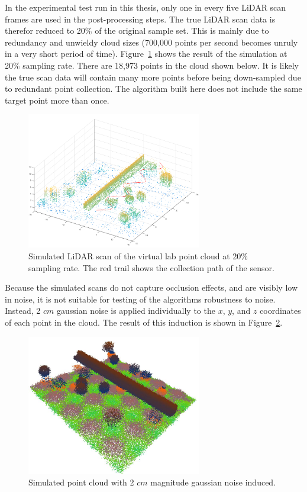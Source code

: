 \documentclass[12pt]{drexelthesis}
\begin{document}
In the experimental test run in this thesis, only one in every five LiDAR scan frames are used in the post-processing steps. The true LiDAR scan data is therefor reduced to 20\% of the original sample set. This is mainly due to redundancy and unwieldy cloud sizes (700,000 points per second becomes unruly in a very short period of time). Figure~\ref{lidarsim:20psample} shows the result of the simulation at 20\% sampling rate. There are 18,973 points in the cloud shown below. It is likely the true scan data will contain many more points before being down-sampled due to redundant point collection. The algorithm built here does not include the same target point more than once.

\begin{figure}[!ht]
	\centering
	\includegraphics[width=3in]{simulated-lab-scan/lidarSim/20psample.png}
	\caption[Simulated LiDAR scan at 20\% sampling rate]{\centering Simulated LiDAR scan of the virtual lab point cloud at 20\% sampling rate. The red trail shows the collection path of the sensor.}
	\label{lidarsim:20psample}
\end{figure}

Because the simulated scans do not capture occlusion effects, and are visibly low in noise, it is not suitable for testing of the algorithms robustness to noise. Instead, 2 $cm$ gaussian noise is applied individually to the $x$, $y$, and $z$ coordinates of each point in the cloud. The result of this induction is shown in Figure~\ref{2cmnoise:raw}.

\begin{figure}[!ht] 
	\centering
		\includegraphics[width=3in]{simulated-lab-scan/2cmnoise/rawcloud.jpg}
		\caption[Simulated point cloud with 2cm magnitude gaussian noise induced]{\centering  Simulated point cloud with 2 $cm$ magnitude gaussian noise induced.}
\label{2cmnoise:raw}
\end{figure}
\end{document}
